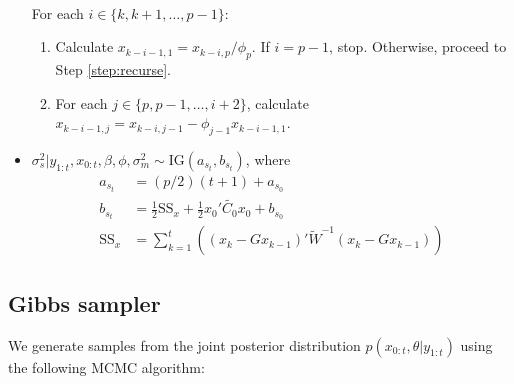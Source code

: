 \documentclass{article}
\begin{document}
\begin{itemize}
\\
For each $i \in \{k,k+1,\ldots,p-1\}$:
\begin{enumerate}
\item Calculate $x_{k-i-1,1} = x_{k-i,p} / \phi_p$. If $i = p - 1$, stop. Otherwise, proceed to Step \ref{step:recurse}.
\item For each $j \in \{p,p-1,\ldots,i+2\}$, calculate $x_{k-i-1,j} = x_{k-i,j-1} - \phi_{j-1}x_{k-i-1,1}$. \label{step:recurse}
\end{enumerate}
\item $\sigma^2_s|y_{1:t},x_{0:t},\beta,\phi,\sigma^2_m \sim \mbox{IG}(a_{s_t}, b_{s_t})$, where
\begin{align*}
a_{s_t} &= (p/2)(t+1) + a_{s_0} \\
b_{s_t} &= \frac{1}{2}\mbox{SS}_x + \frac{1}{2}x_0'\tilde{C_0}x_0 + b_{s_0} \\
\mbox{SS}_x &= \sum^t_{k=1} \left((x_k - Gx_{k-1})'\tilde{W}^{-1}(x_k - Gx_{k-1})\right)
\end{align*}
\end{itemize}

\subsection{Gibbs sampler}

We generate samples from the joint posterior distribution $p(x_{0:t},\theta|y_{1:t})$ using the following MCMC algorithm:
\end{document}
